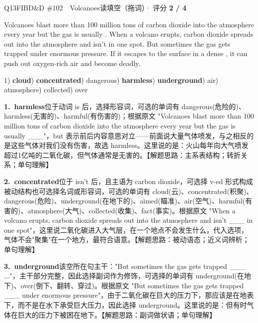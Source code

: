 \begin{qblock}{Q13\quad FIBD\&D \#102\ \ Volcanoes}{读填空（拖词）· 评分 \textcolor{cAccent}{\bfseries 2 / 4}}
\begin{promptbox}
Volcanoes blast more than 100 million tons of carbon dioxide into the atmosphere every year but the gas is usually . When a volcano erupts, carbon dioxide spreads out into the atmosphere and isn't  in one spot. But sometimes the gas gets trapped  under enormous pressure. If it escapes to the surface in a dense , it can push out oxygen-rich air and become deadly.
\end{promptbox}
{\small 1) \textbf{cloud}) \textbf{concentrated}) dangerous) \textbf{harmless}) \textbf{underground}) air) atmosphere) collected) over}
\begin{notebox}\footnotesize
\textbf{1.\ harmless}\quad 位于动词 is 后，选择形容词，可选的单词有 dangerous(危险的)、harmless(无害的)、harmful(有伤害的)；根据原文 "Volcanoes blast more than 100 million tons of carbon dioxide into the atmosphere every year but the gas is usually \_\_\_"，but 表示前后内容意思对立——前面说大量气体喷发，与之相反的是这些气体对我们没有伤害，故选 harmless。这里说的是：火山每年向大气喷发超过1亿吨的二氧化碳，但气体通常是无害的。【解题思路：主系表结构；转折关系；单句理解】\par\smallskip
\textbf{2.\ concentrated}\quad 位于 isn't 后，且主语为 carbon dioxide，可选择 v-ed 形式构成被动结构也可选择名词或形容词，可选的单词有 cloud(云)、concentrated(积聚)、dangerous(危险)、underground(在地下的)、aimed(瞄准)、air(空气)、harmful(有害的)、atmosphere(大气)、collected(收集)、fact(事实)。根据原文 "When a volcano erupts, carbon dioxide spreads out into the atmosphere and isn't \_\_\_ in one spot"，这里说二氧化碳进入大气层，在一个地点不会发生什么，代入选项，气体不会"聚集"在一个地方，最符合语意。【解题思路：被动语态；近义词辨析；单句理解】\par\smallskip
\textbf{3.\ underground}\quad 该空所在句主干："But sometimes the gas gets trapped \_\_\_ ..."，主干部分完整，因此选择副词作为修饰，可选择的单词有 underground(在地下)、over(倒下、翻转、穿过)。根据原文 "But sometimes the gas gets trapped \_\_\_ under enormous pressure"，由于二氧化碳在巨大的压力下，那应该是在地表下，而不是在水下承受巨大压力，因此选择 underground。这里说的是：但有时气体在巨大的压力下被困在地下。【解题思路：副词做状语；单句理解】\par\smallskip

\end{notebox}
\end{qblock}
